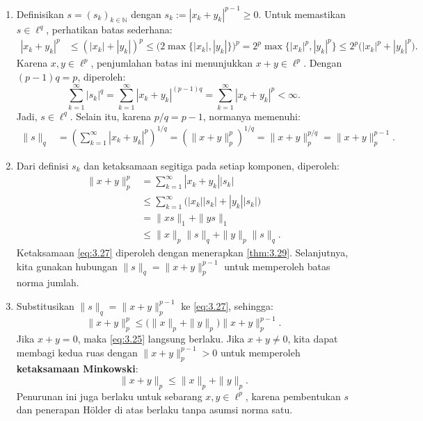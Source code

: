 \documentclass[aspectratio=169,11pt]{beamer}
\theoremstyle{definition}
\newcommand{\myref}[1]{\hyperref[#1]{\nameCref{#1} \ref*{#1}}}
\newcommand{\N}{\mathbb{N}}
\begin{document}
\begin{frame}[allowframebreaks]{\insertsection}{\insertsubsection}
  \begin{enumerate}
    \item Definisikan $s=(s_k)_{k\in\N}$ dengan $s_k:=|x_k+y_k|^{p-1}\geq 0$. Untuk memastikan $s\in\ell^q$, perhatikan batas sederhana:
          \begin{align*}
            |x_k+y_k|^p
             & \leq (|x_k|+|y_k|)^p
            \leq\bigl(2\max\{|x_k|,|y_k|\}\bigr)^p =2^p\max\{|x_k|^p,|y_k|^p\}
            \leq 2^p\bigl(|x_k|^p+|y_k|^p\bigr).
          \end{align*}
          Karena $x,y\in\ell^p$, penjumlahan batas ini menunjukkan $x+y\in\ell^p$. Dengan $(p-1)q=p$, diperoleh:
          \begin{equation*}
            \sum_{k=1}^{\infty}|s_k|^q
            =\sum_{k=1}^{\infty}|x_k+y_k|^{(p-1)q}
            =\sum_{k=1}^{\infty}|x_k+y_k|^p<\infty.
          \end{equation*}
          Jadi, $s\in\ell^q$. Selain itu, karena $p/q=p-1$, normanya memenuhi:
          \begin{align*}
            \|s\|_q
             & =\left(\sum_{k=1}^{\infty}|x_k+y_k|^p\right)^{1/q}
            =\left(\|x+y\|_p^p\right)^{1/q}    =\|x+y\|_p^{p/q}=\|x+y\|_p^{p-1}.
          \end{align*}

    \item Dari definisi $s_k$ dan ketaksamaan segitiga pada setiap komponen, diperoleh:
          \begin{align}
            \|x+y\|_p^p
             & =\sum_{k=1}^{\infty}|x_k+y_k||s_k| \nonumber                             \\
             & \leq\sum_{k=1}^{\infty}\bigl(|x_k||s_k|+|y_k||s_k|\bigr) \label{eq:3.26} \\
             & =\|xs\|_1+\|ys\|_1 \nonumber                                             \\
             & \leq\|x\|_p\|s\|_q+\|y\|_p\|s\|_q. \label{eq:3.27}
          \end{align}
          Ketaksamaan \eqref{eq:3.27} diperoleh dengan menerapkan \myref{thm:3.29}. Selanjutnya, kita gunakan hubungan $\|s\|_q=\|x+y\|_p^{p-1}$ untuk memperoleh batas norma jumlah.

    \item Substitusikan $\|s\|_q=\|x+y\|_p^{p-1}$ ke \eqref{eq:3.27}, sehingga:
          \begin{equation*}
            \|x+y\|_p^p
            \leq \bigl(\|x\|_p+\|y\|_p\bigr)\|x+y\|_p^{p-1}.
          \end{equation*}
          Jika $x+y=0$, maka \eqref{eq:3.25} langsung berlaku. Jika $x+y\neq 0$, kita dapat membagi kedua ruas dengan $\|x+y\|_p^{p-1}>0$ untuk memperoleh \textbf{ketaksamaan Minkowski}:
          \begin{equation*}
            \|x+y\|_p\leq\|x\|_p+\|y\|_p.
          \end{equation*}
          Penurunan ini juga berlaku untuk sebarang $x,y\in\ell^p$, karena pembentukan $s$ dan penerapan H\"older di atas berlaku tanpa asumsi norma satu.


\end{enumerate}
\end{frame}
\end{document}
